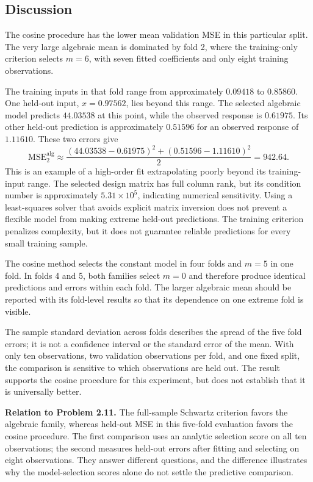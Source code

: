 \documentclass[11pt,a4paper]{article}
\begin{document}
\subsection*{Discussion}
The cosine procedure has the lower mean validation MSE in this particular split. The very large algebraic mean is dominated by fold 2, where the training-only criterion selects $m=6$, with seven fitted coefficients and only eight training observations.

The training inputs in that fold range from approximately $0.09418$ to $0.85860$. One held-out input, $x=0.97562$, lies beyond this range. The selected algebraic model predicts $44.03538$ at this point, while the observed response is $0.61975$. Its other held-out prediction is approximately $0.51596$ for an observed response of $1.11610$. These two errors give
\[
\mathrm{MSE}_2^{\mathrm{alg}}
\approx\frac{(44.03538-0.61975)^2+(0.51596-1.11610)^2}{2}
=942.64.
\]
This is an example of a high-order fit extrapolating poorly beyond its training-input range. The selected design matrix has full column rank, but its condition number is approximately $5.31\times10^5$, indicating numerical sensitivity. Using a least-squares solver that avoids explicit matrix inversion does not prevent a flexible model from making extreme held-out predictions. The training criterion penalizes complexity, but it does not guarantee reliable predictions for every small training sample.

The cosine method selects the constant model in four folds and $m=5$ in one fold. In folds 4 and 5, both families select $m=0$ and therefore produce identical predictions and errors within each fold. The larger algebraic mean should be reported with its fold-level results so that its dependence on one extreme fold is visible.

The sample standard deviation across folds describes the spread of the five fold errors; it is not a confidence interval or the standard error of the mean. With only ten observations, two validation observations per fold, and one fixed split, the comparison is sensitive to which observations are held out. The result supports the cosine procedure for this experiment, but does not establish that it is universally better.

\textbf{Relation to Problem 2.11.} The full-sample Schwartz criterion favors the algebraic family, whereas held-out MSE in this five-fold evaluation favors the cosine procedure. The first comparison uses an analytic selection score on all ten observations; the second measures held-out errors after fitting and selecting on eight observations. They answer different questions, and the difference illustrates why the model-selection scores alone do not settle the predictive comparison.
\end{document}
